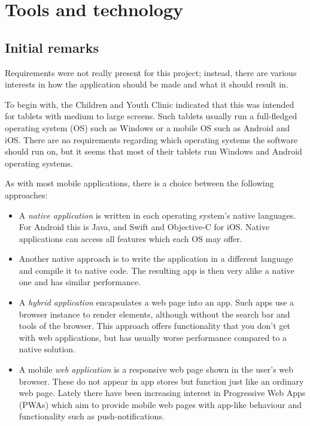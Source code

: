 \chapter{Tools and technology}
\label{ch:tools}

\section{Initial remarks}

Requirements were not really present for this project; instead, there are various interests in how the application should be made and what it should result in.

To begin with, the Children and Youth Clinic indicated that this was intended for tablets with medium to large screens. Such tablets usually run a full-fledged operating system (OS) such as Windows or a mobile OS such as Android and iOS. There are no requirements regarding which operating systems the software should run on, but it seems that most of their tablets run Windows and Android operating systems.

As with most mobile applications, there is a choice between the following approaches:

\begin{itemize}
    \item A \emph{native application} is written in each operating system's native languages. For Android this is Java, and Swift and Objective-C for iOS. Native applications can access all features which each OS may offer.
    \item Another native approach is to write the application in a different language and compile it to native code. The resulting app is then very alike a native one and has similar performance.
    \item A \emph{hybrid application} encapsulates a web page into an app. Such apps use a browser instance to render elements, although without the search bar and tools of the browser. This approach offers functionality that you don't get with web applications, but has usually worse performance compared to a native solution.
    \item A mobile \emph{web application} is a responsive web page shown in the user's web browser. These do not appear in app stores but function just like an ordinary web page. Lately there have been increasing interest in Progressive Web Apps (PWAs) which aim to provide mobile web pages with app-like behaviour and functionality such as push-notifications.
\end{itemize}

